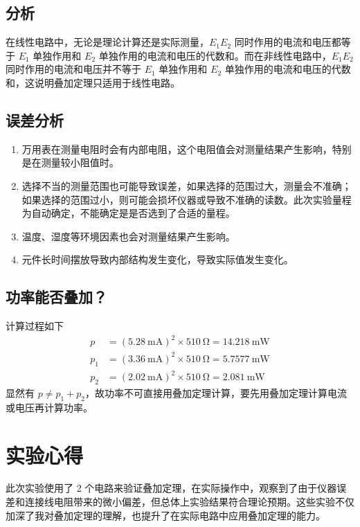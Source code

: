 \documentclass[a4paper,utf8]{article}
\begin{document}
\subsection{分析}
在线性电路中，无论是理论计算还是实际测量，$E_1 E_2$ 同时作用的电流和电压都等于 $E_1$ 单独作用和 $E_2$ 单独作用的电流和电压的代数和。而在非线性电路中，$E_1 E_2$ 同时作用的电流和电压并不等于 $E_1$ 单独作用和 $E_2$ 单独作用的电流和电压的代数和，这说明叠加定理只适用于线性电路。
\subsection{误差分析}
    \begin{enumerate}
        \item 万用表在测量电阻时会有内部电阻，这个电阻值会对测量结果产生影响，特别是在测量较小阻值时。
        \item 选择不当的测量范围也可能导致误差，如果选择的范围过大，测量会不准确；如果选择的范围过小，则可能会损坏仪器或导致不准确的读数。此次实验量程为自动确定，不能确定是是否选到了合适的量程。
        \item 温度、湿度等环境因素也会对测量结果产生影响。
        \item 元件长时间摆放导致内部结构发生变化，导致实际值发生变化。
    \end{enumerate}
\subsection{功率能否叠加？}
计算过程如下
\begin{align*}
    p &= (\SI{5.28}{\mA})^2 \times \SI{510}{\ohm} = \SI{14.218}{\mW} \\
    p_1 &= (\SI{3.36}{\mA})^2 \times \SI{510}{\ohm} = \SI{5.7577}{\mW} \\
    p_2 &= (\SI{2.02}{\mA})^2 \times \SI{510}{\ohm} = \SI{2.081}{\mW}
\end{align*}
显然有 $p \neq p_1 + p_2$，故功率不可直接用叠加定理计算，要先用叠加定理计算电流或电压再计算功率。
\section{实验心得}
此次实验使用了 2 个电路来验证叠加定理，在实际操作中，观察到了由于仪器误差和连接线电阻带来的微小偏差，但总体上实验结果符合理论预期。这些实验不仅加深了我对叠加定理的理解，也提升了在实际电路中应用叠加定理的能力。
\clearpage
\end{document}
